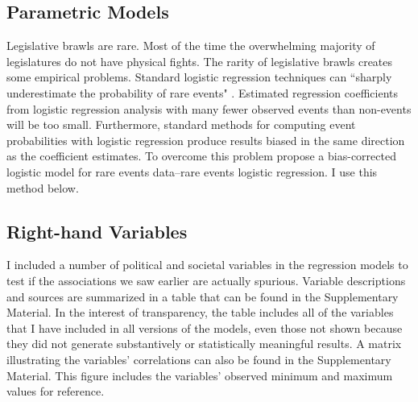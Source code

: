 \documentclass[a4paper]{article}\usepackage[]{graphicx}\usepackage[]{color}
\begin{document}
\subsection{Parametric Models}

Legislative brawls are rare. Most of the time the overwhelming majority of legislatures do not have physical fights. The rarity of legislative brawls creates some empirical problems. Standard logistic regression techniques can ``sharply underestimate the probability of rare events" \cite[137]{KingRareEventsPA2001}. Estimated regression coefficients from logistic regression analysis with many fewer observed events than non-events will be too small. Furthermore, standard methods for computing event probabilities with logistic regression produce results biased in the same direction as the coefficient estimates. To overcome this problem \cite{KingRareEvents2001,KingRareEventsPA2001} propose a bias-corrected logistic model for rare events data--rare events logistic regression. I use this method below.

\subsection{Right-hand Variables}

I included a number of political and societal variables in the regression models to test if the associations we saw earlier are actually spurious. Variable descriptions and sources are summarized in a table that can be found in the Supplementary Material. In the interest of transparency, the table includes all of the variables that I have included in all versions of the models, even those not shown because they did not generate substantively or statistically meaningful results. A matrix illustrating the variables' correlations can also be found in the Supplementary Material. This figure includes the variables' observed minimum and maximum values for reference.
\end{document}
